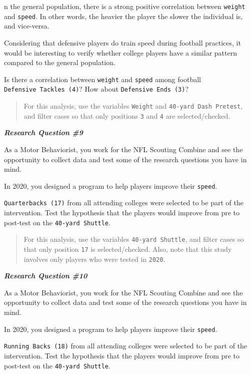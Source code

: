 \documentclass[11pt,]{article}
\begin{document}
n the general population, there is a strong positive correlation between
\texttt{weight} and \texttt{speed}. In other words, the heavier the
player the slower the individual is, and vice-versa.

Considering that defensive players do train speed during football
practices, it would be interesting to verify whether college players
have a similar pattern compared to the general population.

Is there a correlation between \texttt{weight} and \texttt{speed} among
football \texttt{Defensive\ Tackles\ (4)}? How about
\texttt{Defensive\ Ends\ (3)}?

\begin{quote}
For this analysis, use the variables \texttt{Weight} and
\texttt{40-yard\ Dash\ Pretest}, and filter cases so that only positions
\texttt{3} and \texttt{4} are selected/checked.
\end{quote}

\textbf{\emph{Research Question \#9}}

As a Motor Behaviorist, you work for the NFL Scouting Combine and see
the opportunity to collect data and test some of the research questions
you have in mind.

In 2020, you designed a program to help players improve their
\texttt{speed}.

\texttt{Quarterbacks\ (17)} from all attending colleges were selected to
be part of the intervention. Test the hypothesis that the players would
improve from pre to post-test on the \texttt{40-yard\ Shuttle}.

\begin{quote}
For this analysis, use the variables \texttt{40-yard\ Shuttle}, and
filter cases so that only position \texttt{17} is selected/checked.
Also, note that this study involves only players who were tested in
\texttt{2020}.
\end{quote}

\textbf{\emph{Research Question \#10}}

As a Motor Behaviorist, you work for the NFL Scouting Combine and see
the opportunity to collect data and test some of the research questions
you have in mind.

In 2020, you designed a program to help players improve their
\texttt{speed}.

\texttt{Running\ Backs\ (18)} from all attending colleges were selected
to be part of the intervention. Test the hypothesis that the players
would improve from pre to post-test on the \texttt{40-yard\ Shuttle}.
\end{document}
